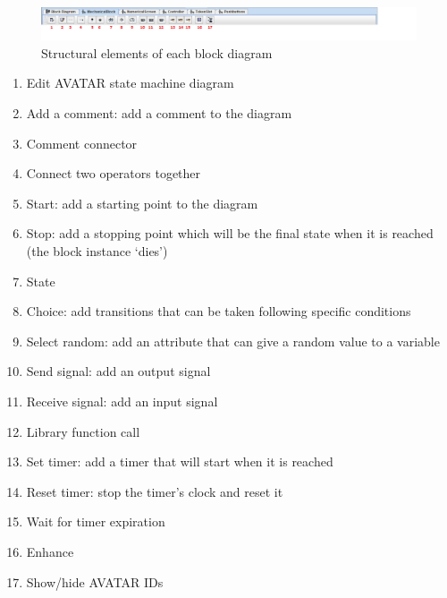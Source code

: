 \documentclass[12pt]{article}
\begin{document}
\begin{figure}[htbp]
\centering
\includegraphics[width=0.99\textwidth]{fig/structelementsblock.png}
\caption{Structural elements of each block diagram} \label{fig:structelementsblock}
\end{figure}

\begin{enumerate}
\item Edit AVATAR state machine diagram
\item Add a comment: add a comment to the diagram
\item Comment connector
\item Connect two operators together
\item Start: add a starting point to the diagram
\item Stop: add a stopping point which will be the final state when it is reached (the block instance `dies')
\item State
\item Choice: add transitions that can be taken following specific conditions
\item Select random: add an attribute that can give a random value to a variable
\item Send signal: add an output signal
\item Receive signal: add an input signal
\item Library function call
\item Set timer: add a timer that will start when it is reached
\item Reset timer: stop the timer's clock and reset it
\item Wait for timer expiration
\item Enhance
\item Show/hide AVATAR IDs
\end{enumerate}
\end{document}
